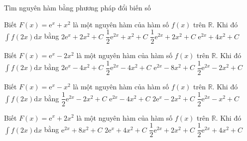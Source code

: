 \begin{dang}
	{Tìm nguyên hàm bằng phương pháp đổi biến số}
\end{dang}        
\begin{ex}
	[Mã 101 – 2020 Lần 2]%
	Biết $ F(x)=\mathrm{e}^x+x^2$ là một nguyên hàm của hàm số $ f(x)$ trên $\mathbb{R}$. Khi đó $\displaystyle\int{f\left(2x\right)}\mathrm{d}x$ bằng
	\choice
	{$ 2\mathrm{e}^x+2x^2+C$}
	{$\dfrac{1}{2}{\mathrm{e}^{2x}}+x^2+C$}
	{\True $\dfrac{1}{2}{\mathrm{e}^{2x}}+2x^2+C$}
	{$\mathrm{e}^{2x}+4x^2+C$}
\end{ex}
\begin{ex}
	[Mã 102 - 2020 Lần 2]%
	Biết $ F(x)=\mathrm{e}^x-2x^2$ là một nguyên hàm của hàm số $ f(x)$ trên $\mathbb{R}$. Khi đó $\displaystyle\int{f\left(2x\right)}\mathrm{d}x$ bằng
	\choice
	{$ 2\mathrm{e}^x-4x^2+C$}
	{\True $\dfrac{1}{2}{\mathrm{e}^{2x}}-4x^2+C$}
	{$\mathrm{e}^{2x}-8x^2+C$}
	{$\dfrac{1}{2}{\mathrm{e}^{2x}}-2x^2+C$}
\end{ex}
\begin{ex}
	[Mã 103 - 2020 Lần 2]%
	Biết $ F(x)=\mathrm{e}^x-x^2$ là một nguyên hàm của hàm số $ f(x)$ trên $\mathbb{R}$. Khi đó $\displaystyle\int{f\left(2x\right)\mathrm{d}x}$ bằng
	\choice
	{\True $\dfrac{1}{2}{\mathrm{e}^{2x}}-2x^2+C$}
	{$\mathrm{e}^{2x}-4x^2+C$}
	{$ 2\mathrm{e}^x-2x^2+C$}
	{$\dfrac{1}{2}{\mathrm{e}^{2x}}-x^2+C$}
\end{ex}
\begin{ex}
	[Mã 104 - 2020 Lần 2]%
	Biết $ F(x)=\mathrm{e}^x+2x^2$ là một nguyên hàm của hàm số $ f(x)$ trên $\mathbb{R}$. Khi đó $\displaystyle\int{f\left(2x\right)\mathrm{d}x}$ bằng
	\choice
	{$\mathrm{e}^{2x}+8x^2+C$}
	{$ 2\mathrm{e}^x+4x^2+C$}
	{$\dfrac{1}{2}{\mathrm{e}^{2x}}+2x^2+C$}
	{\True $\dfrac{1}{2}{\mathrm{e}^{2x}}+4x^2+C$}
\end{ex}

